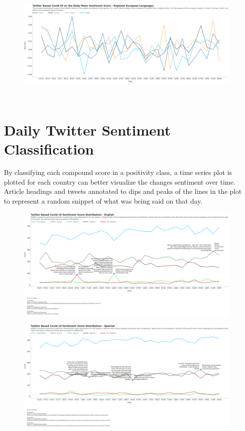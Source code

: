 \begin{landscape}
\begin{figure}[h!]
\includegraphics[scale=0.33]{Daily Mean Europe.png}
\caption[Daily Mean Europe]{ }
\label{fig:globaleu}
\end{figure}

\newpage~\newpage~\newpage~\newpage

\section{Daily Twitter Sentiment Classification}

By classifying each compound score in a positivity class, a time series plot is plotted for each country can better visualize the changes sentiment over time.
Article headings and tweets annotated to dips and peaks of the lines in the plot to represent a random snippet of what was being said on that day.

\begin{figure}[h!]
\includegraphics[scale=0.33]{Final English Annotated Distribution.png}
\caption[English Annotated Sentiment Distribution]{ }
\label{fig:English}
\end{figure}

\begin{figure}[h!]
\includegraphics[scale=0.33]{Final Spanish Annotated Distribution.png}
\caption[English Annotated Sentiment Distribution]{ }
\label{fig:Spanish}
\end{figure}


\end{landscape}
